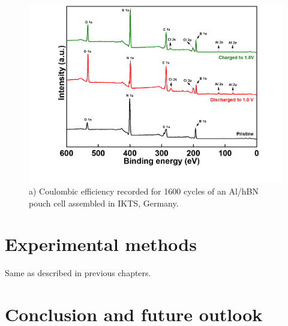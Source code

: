 \begin{figure}[tbh!]
\centering
\includegraphics[width=\textwidth]{Figures/BOhBN/hBNXPS}
\caption{a) Coulombic efficiency recorded for 1600 cycles of an Al/hBN pouch cell assembled in IKTS, Germany.}
\label{Figures/BOhBN:hBNXPS}
\end{figure}
\section{Experimental methods}
Same as described in previous chapters.
\section{Conclusion and future outlook}
